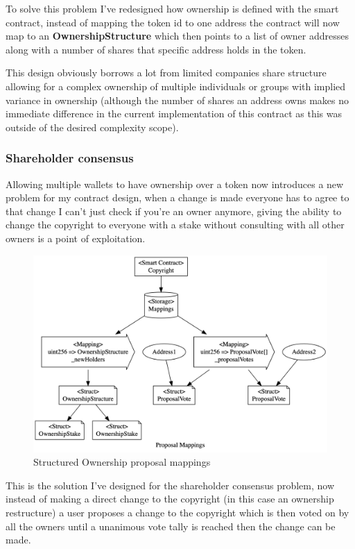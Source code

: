 \documentclass[12pt]{article}
\begin{document}
To solve this problem I've redesigned how ownership is defined with the smart contract, instead of mapping the token id to one address the contract will now map to an \textbf{OwnershipStructure} which then points to a list of owner addresses along with a number of shares that specific address holds in the token.

This design obviously borrows a lot from limited companies share structure allowing for a complex ownership of multiple individuals or groups with implied variance in ownership (although the number of shares an address owns makes no immediate difference in the current implementation of this contract as this was outside of the desired complexity scope).

\subsubsection{Shareholder consensus}

Allowing multiple wallets to have ownership over a token now introduces a new problem for my contract design, when a change is made everyone has to agree to that change I can't just check if you're an owner anymore, giving the ability to change the copyright to everyone with a stake without consulting with all other owners is a point of exploitation.

\begin{figure}[H]
\caption{Structured Ownership proposal mappings}
\centering
\includegraphics[width=\textwidth,height=\textheight,keepaspectratio]{images/operational/prop-mappings.png}
\end{figure}

This is the solution I've designed for the shareholder consensus problem, now instead of making a direct change to the copyright (in this case an ownership restructure) a user proposes a change to the copyright which is then voted on by all the owners until a unanimous vote tally is reached then the change can be made.
\end{document}
